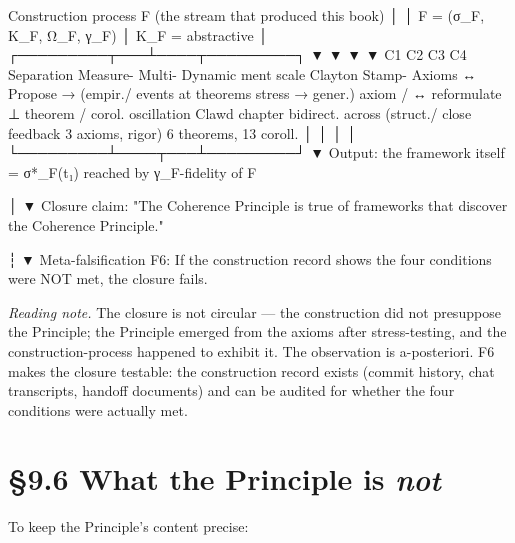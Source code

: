 \documentclass[11pt, openany]{book}
\newcommand{\sectionbreak}{\clearpage}
\begin{document}
\begin{Code}
          Construction process F
   (the stream that produced this book)
                    │
                    │  F = (σ_F, K_F, Ω_F, γ_F)
                    │  K_F = abstractive
                    │
      ┌─────────┬───┴────┬─────────┐
      ▼         ▼        ▼         ▼
    C1        C2       C3        C4
  Separation Measure-  Multi-    Dynamic
             ment      scale
  Clayton   Stamp-    Axioms ↔   Propose →
  (empir./  events at  theorems  stress →
  gener.)   axiom /    ↔         reformulate
   ⊥        theorem /  corol.    oscillation
  Clawd     chapter    bidirect. across
  (struct./ close      feedback  3 axioms,
  rigor)                         6 theorems,
                                 13 coroll.
      │         │        │         │
      └─────────┴────┬───┴─────────┘
                    ▼
      Output: the framework itself
              = σ*_F(t₁) reached by
              γ_F-fidelity of F

                    │
                    ▼
  Closure claim:
  "The Coherence Principle is true of
  frameworks that discover the Coherence
  Principle."

                    ┆
                    ▼
  Meta-falsification F6:
  If the construction record shows the
  four conditions were NOT met, the
  closure fails.
\end{Code}

\textit{Reading note.} The closure is not circular --- the construction did not presuppose the Principle; the Principle emerged from the axioms after stress-testing, and the construction-process happened to exhibit it. The observation is a-posteriori. F6 makes the closure testable: the construction record exists (commit history, chat transcripts, handoff documents) and can be audited for whether the four conditions were actually met.

\sectionbreak

\section{§9.6 What the Principle is \textit{not}}

To keep the Principle's content precise:
\end{document}
